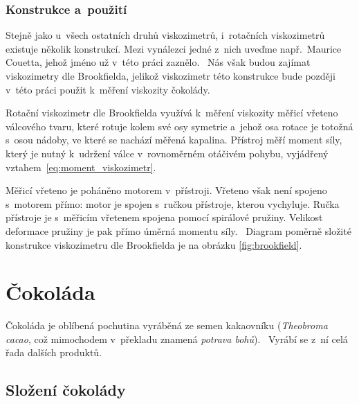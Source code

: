 \documentclass[12pt]{article}
\begin{document}
\subsubsection{Konstrukce a~použití}%

Stejně jako u~všech ostatních druhů viskozimetrů, i~rotačních viskozimetrů existuje několik konstrukcí. Mezi vynálezci jedné z~nich uveďme např.~Maurice Couetta, jehož jméno už v~této práci zaznělo.~\cite{wiki:Maurice_Couette} Nás však budou zajímat viskozimetry dle Brookfielda, jelikož viskozimetr této konstrukce bude později v~této práci použit k~měření viskozity čokolády.
\par\noindent
Rotační viskozimetr dle Brookfielda využívá k~měření viskozity měřicí vřeteno válcového tvaru, které rotuje kolem své osy symetrie a~jehož osa rotace je totožná s~osou nádoby, ve které se nachází měřená kapalina. Přístroj měří moment síly, který je nutný k~udržení válce v~rovnoměrném otáčivém pohybu, vyjádřený vztahem~\ref{eq:moment_viskozimetr}.
\par\noindent
Měřicí vřeteno je poháněno motorem v~přístroji. Vřeteno však není spojeno s~motorem přímo: motor je spojen s~ručkou přístroje, kterou vychyluje. Ručka přístroje je s~měřicím vřetenem spojena pomocí spirálové pružiny. Velikost deformace pružiny je pak přímo úměrná momentu síly.~\cite{man:brookfield} Diagram poměrně složité konstrukce viskozimetru dle Brookfielda je na obrázku \ref{fig:brookfield}.

\newpage%
\section{Čokoláda}%

Čokoláda je oblíbená pochutina vyráběná ze semen kakaovníku (\emph{Theobroma cacao}, což mimochodem v~překladu znamená \emph{potrava bohů}).~\cite{wiki:Kakao} Vyrábí se z~ní celá řada dalších produktů.

\subsection{Složení čokolády}%
\label{sec:složení_čokolády}%
\end{document}

